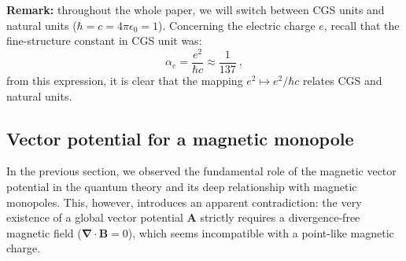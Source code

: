 \documentclass[a4paper,11pt]{article}
\begin{document}
 \textbf{Remark:} throughout the whole paper, we will switch between CGS units and natural units ($\hbar=c=4\pi \epsilon_0=1$). Concerning the electric charge $e$, recall that the fine-structure constant in CGS unit was:
 \begin{equation}
    \alpha_e=\dfrac{e^2}{\hbar c}\approx \frac{1}{137}\ ,
 \end{equation}
 from this expression, it is clear that the mapping $e^2\mapsto e^2/\hbar c$ relates CGS and natural units.
 \subsection{Vector potential for a magnetic monopole}
 In the previous section, we observed the fundamental role of the magnetic vector potential in the quantum theory and its deep relationship with magnetic monopoles. This, however, introduces an apparent contradiction: the very existence of a global vector potential $\boldsymbol A$ strictly requires a divergence-free magnetic field ($\boldsymbol \nabla \cdot \boldsymbol B = 0$), which seems incompatible with a point-like magnetic charge. 
 
\end{document}
